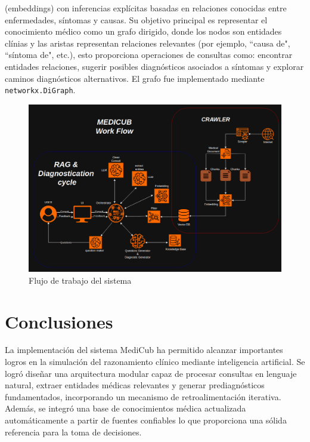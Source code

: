 \documentclass{llncs}
\begin{document}
\begin{itemize}
  (embeddings) con inferencias explícitas basadas en relaciones conocidas entre enfermedades, síntomas y causas. Su objetivo principal es representar el conocimiento médico como un grafo dirigido, donde los nodos son entidades clínias y las aristas representan relaciones relevantes (por ejemplo, ``causa de", ``síntoma de", etc.),
  esto proporciona operaciones de consultas como: encontrar entidades relaciones, sugerir posibles diagnósticos asociados a síntomas y explorar caminos diagnósticos alternativos.
  El grafo fue implementado mediante \texttt{networkx.DiGraph}.
\end{itemize}

\begin{figure}  
\begin{center}
  \includegraphics[scale=0.25]{Work Flow.png}
\end{center}
\caption{Flujo de trabajo del sistema}
\end{figure}

\section{Conclusiones}

La implementación del sistema MediCub ha permitido alcanzar importantes logros en la simulación del razonamiento clínico mediante inteligencia artificial. Se logró diseñar una arquitectura modular capaz de procesar consultas en lenguaje natural, extraer entidades médicas relevantes
y generar prediagnósticos fundamentados, incorporando un mecanismo de retroalimentación iterativa. Además, se integró una base de conocimientos médica actualizada automáticamente a partir de fuentes confiables lo que proporciona una sólida referencia para la toma de decisiones.
\end{document}
